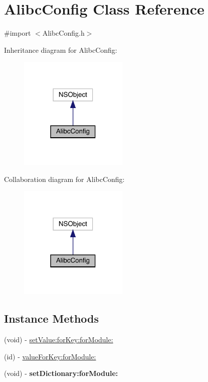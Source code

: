 \hypertarget{interface_alibc_config}{}\section{Alibc\+Config Class Reference}
\label{interface_alibc_config}


{\ttfamily \#import $<$Alibc\+Config.\+h$>$}



Inheritance diagram for Alibc\+Config\+:\nopagebreak
\begin{figure}[H]
\begin{center}
\leavevmode
\includegraphics[width=147pt]{interface_alibc_config__inherit__graph}
\end{center}
\end{figure}


Collaboration diagram for Alibc\+Config\+:\nopagebreak
\begin{figure}[H]
\begin{center}
\leavevmode
\includegraphics[width=147pt]{interface_alibc_config__coll__graph}
\end{center}
\end{figure}
\subsection*{Instance Methods}
\begin{DoxyCompactItemize}
\item 
(void) -\/ \mbox{\hyperlink{interface_alibc_config_af5522575592d86272ad54740e0135464}{set\+Value\+:for\+Key\+:for\+Module\+:}}
\item 
(id) -\/ \mbox{\hyperlink{interface_alibc_config_abb945e729f62240ba5f9fe97b7430808}{value\+For\+Key\+:for\+Module\+:}}
\item 
\mbox{\label{interface_alibc_config_a41c2c9b3556fbe9d4ed3394cfc95d6f6}} 
(void) -\/ {\bfseries set\+Dictionary\+:for\+Module\+:}
\end{DoxyCompactItemize}

